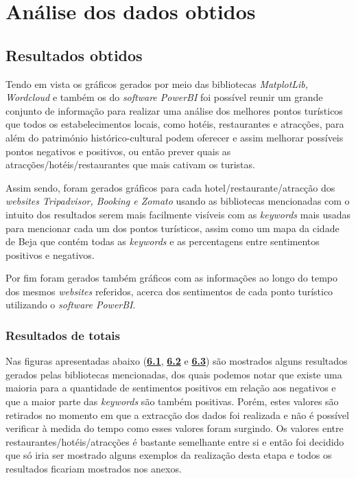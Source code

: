 \chapter{Análise dos dados obtidos}
\label{cap6}

\section{Resultados obtidos}

Tendo em vista os gráficos gerados por meio das bibliotecas \textit{MatplotLib, Wordcloud} \cite{gfg3} \cite{va1} e também os do \textit{software PowerBI}  foi possível reunir um grande conjunto de informação para realizar uma análise dos melhores pontos turísticos que todos os estabelecimentos locais, como hotéis, restaurantes e atracções, para além do património histórico-cultural podem oferecer e assim melhorar possíveis pontos negativos e positivos, ou então prever quais as atracções/hotéis/restaurantes que mais cativam os turistas.

Assim sendo, foram gerados gráficos para cada hotel/restaurante/atracção dos \textit{websites Tripadvisor, Booking e Zomato} usando as bibliotecas mencionadas com o intuito dos resultados serem mais facilmente visíveis com as \textit{keywords} mais usadas para mencionar cada um dos pontos turísticos, assim como um mapa da cidade de Beja que contém todas as \textit{keywords} e as percentagens entre sentimentos positivos e negativos.

Por fim foram gerados também gráficos com as informações ao longo do tempo dos mesmos \textit{websites} referidos, acerca dos sentimentos de cada ponto turístico utilizando o \textit{software PowerBI}.

\subsection{Resultados de totais}

Nas figuras apresentadas abaixo (\hyperref[fig:top10keywpcbeja]{\textbf{6.1}}, \hyperref[fig:top100keywcpcbeja]{\textbf{6.2}} e \hyperref[fig:sentpercetpcbeja]{\textbf{6.3}}) são mostrados alguns resultados gerados pelas bibliotecas mencionadas, dos quais podemos notar que existe uma maioria para a quantidade de sentimentos positivos em relação aos negativos e que a maior parte das \textit{keywords} são também positivas. Porém, estes valores são retirados no momento em que a extracção dos dados foi realizada e não é possível verificar à medida do tempo como esses valores foram surgindo. Os valores entre restaurantes/hotéis/atracções é bastante semelhante entre si e então foi decidido que só iria ser mostrado alguns exemplos da realização desta etapa e todos os resultados ficariam mostrados nos anexos.

